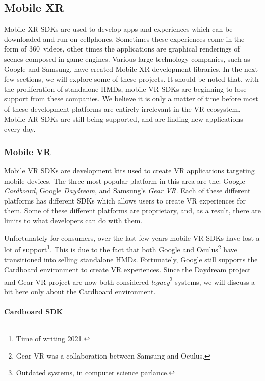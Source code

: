 
\subsection{Mobile XR}

Mobile XR SDKs are used to develop apps and experiences which can be downloaded and run on cellphones. Sometimes these experiences come in the form of 360\textdegree \ videos, other times the applications are graphical renderings of scenes composed in game engines. Various large technology companies, such as Google and Samsung, have created Mobile XR development libraries. In the next few sections, we will explore some of these projects. It should be noted that, with the proliferation of standalone HMDs, mobile VR SDKs are beginning to lose support from these companies. We believe it is only a matter of time before most of these development platforms are entirely irrelevant in the VR ecosystem. Mobile AR SDKs are still being supported, and are finding new applications every day.

\subsubsection{Mobile VR}

Mobile VR SDKs are development kits used to create VR applications targeting mobile devices. The three most popular platform in this area are the: Google \textit{Cardboard}, Google \textit{Daydream}, and Samsung's \textit{Gear VR}. Each of these different platforms has different SDKs which allows users to create VR experiences for them. Some of these different platforms are proprietary, and, as a result, there are limits to what developers can do with them. 

Unfortunately for consumers, over the last few years mobile VR SDKs have lost a lot of support\footnote{Time of writing 2021.}. This is due to the fact that both Google and Oculus\footnote{Gear VR was a collaboration between Samsung and Oculus.} have transitioned into selling standalone HMDs. Fortunately, Google still supports the Cardboard environment to create VR experiences. Since the Daydream project and Gear VR project are now both considered \textit{legacy}\footnote{Outdated systems, in computer science parlance.} systems, we will discuss a bit here only about the Cardboard environment. 

\paragraph{Cardboard SDK}

